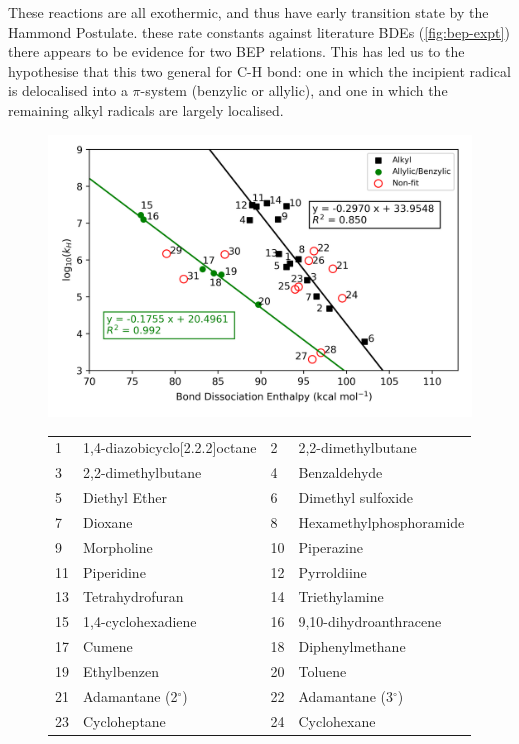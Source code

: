 These reactions are all exothermic, and thus have early transition state by the Hammond Postulate.\cite{Russell1973}  these rate constants against literature BDEs (\ref{fig:bep-expt}) there appears to be evidence for two BEP relations. This has led us to the hypothesise that this two general for C-H bond: one in which the incipient radical is delocalised into a $\pi$-system (benzylic or allylic), and one in which the remaining alkyl radicals are largely localised.

\begin{figure}[H]
  \centering
  \includegraphics[width=\textwidth]{figures/bep-expt}
\begin{tabularx}{\textwidth}{| l X l X |}
  \hline
  1 & 1,4-diazobicyclo[2.2.2]octane & 2 & 2,2-dimethylbutane \\
  3 & 2,2-dimethylbutane & 4 & Benzaldehyde \\
  5 & Diethyl Ether & 6 & Dimethyl sulfoxide \\
  7 & Dioxane & 8 & Hexamethylphosphoramide \\
  9 & Morpholine & 10 & Piperazine \\
  11 & Piperidine & 12 & Pyrroldiine \\
  13 & Tetrahydrofuran & 14 & Triethylamine \\
  15 & 1,4-cyclohexadiene & 16 & 9,10-dihydroanthracene \\
  17 & Cumene & 18 & Diphenylmethane \\
  19 & Ethylbenzen & 20 & Toluene \\
  21 & Adamantane (2$^\circ$) & 22 & Adamantane (3$^\circ$) \\
  23 & Cycloheptane & 24 & Cyclohexane \\

\end{tabularx}
\end{figure}
